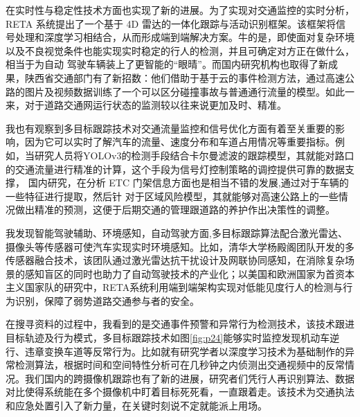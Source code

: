 在实时性与稳定性技术方面也实现了新的进展。为了实现对交通监控的实时分析，RETA 系统\cite{zhang2023reta}提出了一个基于 4D 雷达的一体化跟踪与活动识别框架。该框架将信号处理和深度学习相结合，从而形成端到端解决方案。牛的是，即使面对复杂环境以及不良视觉条件也能实现实时稳定的行人的检测，并且可确定对方正在做什么，相当于为自动 驾驶车辆装上了更智能的“眼晴”。而国内研究机构也取得了新成果，陕西省交通部门有了新招数：他们借助于基于云的事件检测方法，通过高速公路的图片及视频数据训练了一个可以区分碰撞事故与普通通行流量的模型。如此一来，对于道路交通网运行状态的监测较以往来说更加及时、精准。

我也有观察到多目标跟踪技术对交通流量监控和信号优化方面有着至关重要的影响，因为它可以实时了解汽车的流量、速度分布和车道占用情况等重要指标。例如，当研究人员将YOLOv3的检测手段结合卡尔曼滤波的跟踪模型，其就能对路口的交通流量进行精准的计算，这个手段为信号灯控制策略的调控提供可靠的数据支撑， 国内研究，在分析 ETC 门架信息方面也是相当不错的发展,通过对于车辆的一些特征进行提取，然后针 对于区域风险模型，其就能够对高速公路上的一些情况做出精准的预测，这便于后期交通的管理跟道路的养护作出决策性的调整。

我发现智能驾驶辅助、环境感知，自动驾驶方面,多目标跟踪算法配合激光雷达、摄像头等传感器可使汽车实现实时环境感知。比如，清华大学杨殿阁团队\cite{tsinghua2023环境感知}开发的多传感器融合技术，该团队通过激光雷达抗干扰设计及网联协同感知，在消除复杂场景的感知盲区的同时也助力了自动驾驶技术的产业化；以美国和欧洲国家为首资本主义国家队的研究中，RETA系统利用端到端架构实现对低能见度行人的检测与行为识别，保障了弱势道路交通参与者的安全。

在搜寻资料的过程中，我看到的是交通事件预警和异常行为检测技术，该技术跟进目标轨迹及行为模式，多目标跟踪技术如图\ref{fig:p24}能够实时监控发现机动车逆行、违章变换车道等反常行为。比如就有研究学者以深度学习技术为基础制作的异常检测算法，根据时间和空间特性分析可在几秒钟之内侦测出交通视频中的反常情况。我们国内的跨摄像机跟踪也有了新的进展，研究者们凭行人再识别算法、数据对比使得系统能在多个摄像机中盯着目标死死看，一直跟着走。该技术为交通执法和应急处置引入了新力量，在关键时刻说不定就能派上用场。

















